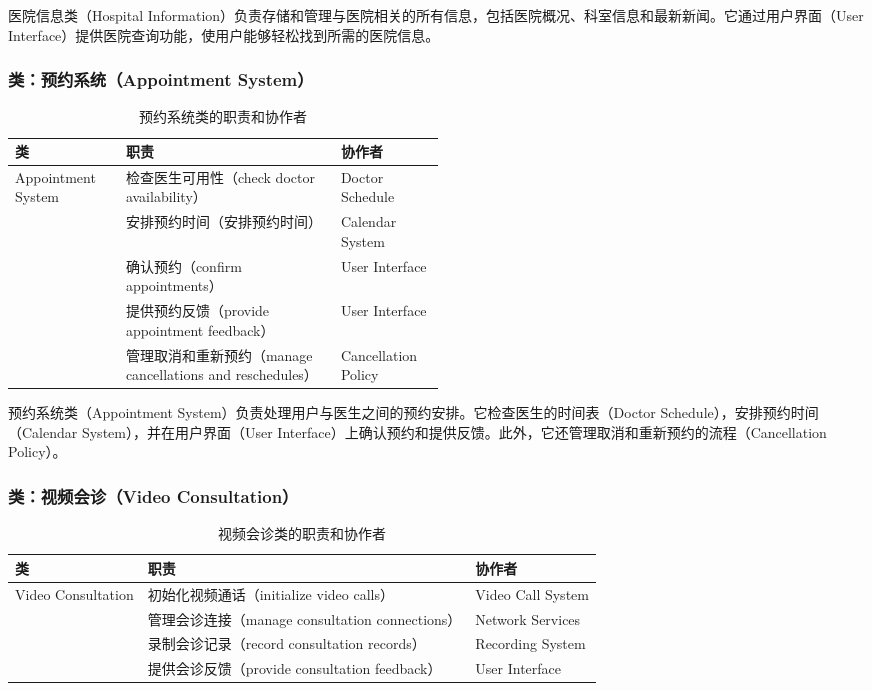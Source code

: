 医院信息类（Hospital Information）负责存储和管理与医院相关的所有信息，包括医院概况、科室信息和最新新闻。它通过用户界面（User Interface）提供医院查询功能，使用户能够轻松找到所需的医院信息。

\subsubsection{类：预约系统（Appointment System）}
\begin{table}[htbp]
	\centering
	\begin{tabular}{|l|p{0.5\linewidth}|l|}
		\hline
		\textbf{类} & \textbf{职责} & \textbf{协作者} \\
		\hline
		Appointment System & 检查医生可用性（check doctor availability） & Doctor Schedule \\
		& 安排预约时间（安排预约时间） & Calendar System \\
		& 确认预约（confirm appointments） & User Interface \\
		& 提供预约反馈（provide appointment feedback） & User Interface \\
		& 管理取消和重新预约（manage cancellations and reschedules） & Cancellation Policy \\
		\hline
	\end{tabular}
	\caption{预约系统类的职责和协作者}
	\label{tab:appointment_system}
\end{table}

预约系统类（Appointment System）负责处理用户与医生之间的预约安排。它检查医生的时间表（Doctor Schedule），安排预约时间（Calendar System），并在用户界面（User Interface）上确认预约和提供反馈。此外，它还管理取消和重新预约的流程（Cancellation Policy）。

\subsubsection{类：视频会诊（Video Consultation）}
\begin{table}[htbp]
	\centering
	\begin{tabular}{|l|l|l|}
		\hline
		\textbf{类} & \textbf{职责} & \textbf{协作者} \\
		\hline
		Video Consultation & 初始化视频通话（initialize video calls） & Video Call System \\
		& 管理会诊连接（manage consultation connections） & Network Services \\
		& 录制会诊记录（record consultation records） & Recording System \\
		& 提供会诊反馈（provide consultation feedback） & User Interface \\
		\hline
	\end{tabular}
	\caption{视频会诊类的职责和协作者}
	\label{tab:video_consultation}
\end{table}

